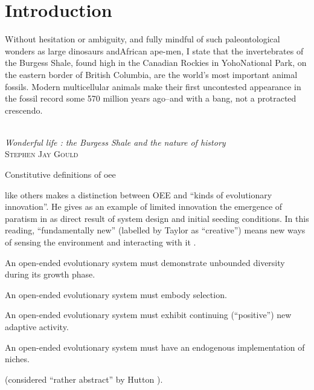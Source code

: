 \chapter{Introduction}\label{introduction}

\settowidth{\epigraphwidth}{Wonderful life : the Burgess Shale and the nature of history}
\epigraph{%
Without hesitation or ambiguity, and fully mindful of such paleontological wonders as large dinosaurs andAfrican ape-men, I state that the invertebrates of the Burgess Shale, found high in the Canadian Rockies in YohoNational Park, on the eastern border of British Columbia, are the world's most important animal fossils. Modern multicellular animals make their first uncontested appearance in the fossil record some 570 million years ago--and with a bang, not a protracted crescendo.}%
{\textit{\\Wonderful life : the Burgess Shale and the nature of history}\\\textsc{Stephen Jay Gould}}

Constitutive definitions of \gls{oee}

\parencite{Taylor2001} like others makes a distinction between OEE and ``kinds of evolutionary innovation''. He gives as an example of limited innovation the emergence of paratism in \cite{Ray1991} as direct result of system design and initial seeding conditions. In this reading, ``fundamentally new'' (labelled by Taylor as ``creative'') means new ways of sensing the environment and interacting with it \cite{Taylor2001}.


\begin{compactitem}
	\item An open-ended evolutionary system must demonstrate unbounded diversity during its growth phase.
	\item An open-ended evolutionary system must embody selection.
	\item An open-ended evolutionary system must exhibit continuing (``positive'') new adaptive activity.
	\item An open-ended evolutionary system must have an endogenous implementation of niches.
\end{compactitem} \cite{Maley1999} (considered ``rather abstract'' by Hutton \parencite[p.341]{Hutton2002}).

